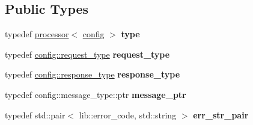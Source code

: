 \subsection*{Public Types}
\begin{DoxyCompactItemize}
\item 
typedef \hyperlink{classwebsocketpp_1_1processor_1_1processor}{processor}$<$ \hyperlink{classconfig}{config} $>$ {\bfseries type}\hypertarget{classwebsocketpp_1_1processor_1_1processor_ae897e7144ad7b9ece176d13ea5078ae2}{}\label{classwebsocketpp_1_1processor_1_1processor_ae897e7144ad7b9ece176d13ea5078ae2}

\item 
typedef \hyperlink{classwebsocketpp_1_1http_1_1parser_1_1request}{config\+::request\+\_\+type} {\bfseries request\+\_\+type}\hypertarget{classwebsocketpp_1_1processor_1_1processor_ac3926102ce2422e6b40ccea41e764233}{}\label{classwebsocketpp_1_1processor_1_1processor_ac3926102ce2422e6b40ccea41e764233}

\item 
typedef \hyperlink{classwebsocketpp_1_1http_1_1parser_1_1response}{config\+::response\+\_\+type} {\bfseries response\+\_\+type}\hypertarget{classwebsocketpp_1_1processor_1_1processor_aa8d088af1bdb838f1e86df6cf4395981}{}\label{classwebsocketpp_1_1processor_1_1processor_aa8d088af1bdb838f1e86df6cf4395981}

\item 
typedef config\+::message\+\_\+type\+::ptr {\bfseries message\+\_\+ptr}\hypertarget{classwebsocketpp_1_1processor_1_1processor_a7f189eb2eb87b7293d46026fa0950635}{}\label{classwebsocketpp_1_1processor_1_1processor_a7f189eb2eb87b7293d46026fa0950635}

\item 
typedef std\+::pair$<$ lib\+::error\+\_\+code, std\+::string $>$ {\bfseries err\+\_\+str\+\_\+pair}\hypertarget{classwebsocketpp_1_1processor_1_1processor_aa17cb49b100ed209ca8650895812be11}{}\label{classwebsocketpp_1_1processor_1_1processor_aa17cb49b100ed209ca8650895812be11}

\end{DoxyCompactItemize}
